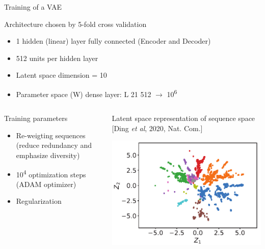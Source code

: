 \documentclass[presentation,smaller]{beamer}
\begin{document}
\begin{frame}[label={sec:org20240dd}]{Training of a VAE}
\begin{block}{Architecture chosen by 5-fold cross validation}
\begin{itemize}
\item 1 \texttimes{} hidden (linear) layer fully connected (Encoder and Decoder)
\item 512 units per hidden layer
\item Latent space dimension = 10
\item Parameter space (W) dense layer: L \texttimes{} 21 \texttimes{} 512 \(\rightarrow\) 10\textsuperscript{6}
\end{itemize}
\end{block}
\begin{columns}
\begin{column}{0.5\columnwidth}
\begin{block}{Training parameters}
\begin{itemize}
\item Re-weigting sequences (reduce redundancy and emphasize diversity)
\item 10\textsuperscript{4} optimization steps (ADAM optimizer)
\item Regularization
\end{itemize}
\end{block}
\end{column}

\begin{column}{0.5\columnwidth}
\begin{block}{Latent space representation of sequence space}
[Ding \emph{et al}, 2020, Nat. Com.]
\begin{center}
\includegraphics[width=.9\linewidth]{img/proj_prot_ding.png}
\end{center}
\end{block}
\end{column}
\end{columns}
\end{frame}
\end{document}
